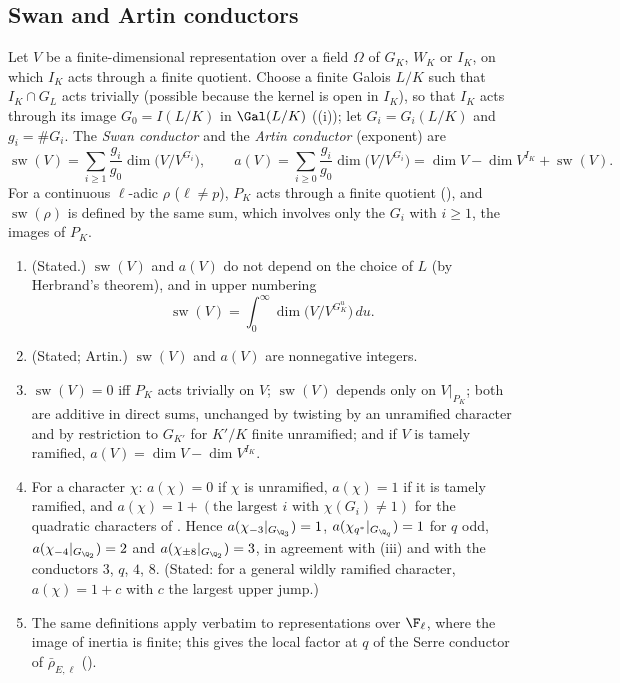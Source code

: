 \subsection{Swan and Artin conductors}

\begin{definition}\label{def:local:swan}
Let $V$ be a finite-dimensional representation over a field $\Omega$ of $G_K$, $W_K$ or $I_K$, on which $I_K$ acts through a finite quotient. Choose a finite Galois
$L/K$ such that $I_K\cap G_L$ acts trivially (possible because the kernel is open in $I_K$), so that $I_K$ acts through its image $G_0=I(L/K)$ in $\Gal(L/K)$
((i)); let $G_i=G_i(L/K)$ and $g_i=\#G_i$. The \emph{Swan conductor} and the \emph{Artin conductor} (exponent) are
\[
\operatorname{sw}(V)=\sum_{i\ge1}\frac{g_i}{g_0}\dim\bigl(V/V^{G_i}\bigr),\qquad a(V)=\sum_{i\ge0}\frac{g_i}{g_0}\dim\bigl(V/V^{G_i}\bigr)=\dim V-\dim V^{I_K}+\operatorname{sw}(V).
\]
For a continuous $\ell$-adic $\rho$ ($\ell\ne p$), $P_K$ acts through a finite quotient (), and $\operatorname{sw}(\rho)$ is defined by the same sum,
which involves only the $G_i$ with $i\ge1$, the images of $P_K$.
\end{definition}

\begin{theorem}\label{thm:local:swan}
\begin{enumerate}[label=(\roman*)]
\item (Stated.) $\operatorname{sw}(V)$ and $a(V)$ do not depend on the choice of $L$ (by Herbrand's theorem), and in upper numbering
\[
\operatorname{sw}(V)=\int_0^\infty\dim\bigl(V/V^{G_K^u}\bigr)\,du .
\]
\item (Stated; Artin.) $\operatorname{sw}(V)$ and $a(V)$ are nonnegative integers.
\item $\operatorname{sw}(V)=0$ iff $P_K$ acts trivially on $V$; $\operatorname{sw}(V)$ depends only on $V|_{P_K}$; both are additive in direct sums, unchanged by twisting by an
unramified character and by restriction to $G_{K'}$ for $K'/K$ finite unramified; and if $V$ is tamely ramified, $a(V)=\dim V-\dim V^{I_K}$.
\item For a character $\chi$: $a(\chi)=0$ if $\chi$ is unramified, $a(\chi)=1$ if it is tamely ramified, and $a(\chi)=1+(\text{the largest }i\text{ with }\chi(G_i)\ne1)$ for
the quadratic characters of . Hence $a(\chi_{-3}|_{G_{\Q_3}})=1$, $a(\chi_{q^*}|_{G_{\Q_q}})=1$ for $q$ odd, $a(\chi_{-4}|_{G_{\Q_2}})=2$ and
$a(\chi_{\pm8}|_{G_{\Q_2}})=3$, in agreement with (iii) and with the conductors $3$, $q$, $4$, $8$. (Stated: for a general wildly ramified
character, $a(\chi)=1+c$ with $c$ the largest upper jump.)
\item The same definitions apply verbatim to representations over $\F_\ell$, where the image of inertia is finite; this gives the local factor at $q$ of
the Serre conductor of $\bar\rho_{E,\ell}$ ().
\end{enumerate}
\end{theorem}

